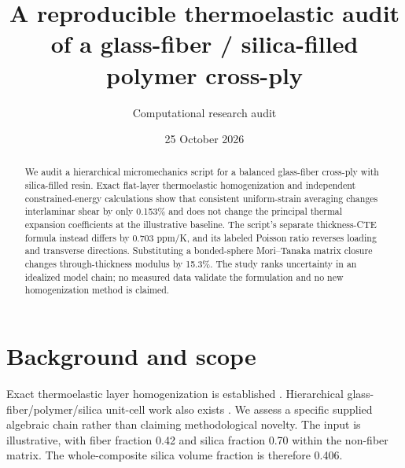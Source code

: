 \documentclass[11pt]{article}
\title{A reproducible thermoelastic audit of a glass-fiber / silica-filled polymer cross-ply}
\author{Computational research audit}
\date{25 October 2026}
\begin{document}
\maketitle
\begin{abstract}
We audit a hierarchical micromechanics script for a balanced glass-fiber
cross-ply with silica-filled resin. Exact flat-layer thermoelastic
homogenization and independent constrained-energy calculations show that
consistent uniform-strain averaging changes interlaminar shear by only
0.153\% and does not change the principal thermal expansion coefficients
at the illustrative baseline. The script's separate thickness-CTE formula
instead differs by 0.703 ppm/K, and its labeled Poisson ratio reverses
loading and transverse directions. Substituting a bonded-sphere
Mori--Tanaka matrix closure changes through-thickness modulus by 15.3\%.
The study ranks uncertainty in an idealized model chain; no measured data
validate the formulation and no new homogenization method is claimed.
\end{abstract}

\section{Background and scope}
Exact thermoelastic layer homogenization is established \cite{ref1,ref2}.
Hierarchical glass-fiber/polymer/silica unit-cell work also exists
\cite{ref3}. We assess a specific supplied algebraic chain rather than
claiming methodological novelty. The input is illustrative, with fiber
fraction 0.42 and silica fraction 0.70 within the non-fiber matrix.
The whole-composite silica volume fraction is therefore 0.406.
\end{document}
